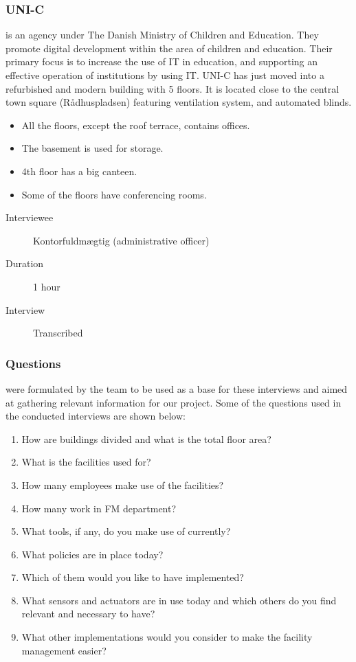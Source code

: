 \subsubsection{UNI-C} is an agency under The Danish Ministry of Children and Education. They promote digital development within the area of children and education. Their primary focus is to increase the use of IT in education, and supporting an effective operation of institutions by using IT. UNI-C has just moved into a refurbished and modern building with 5 floors. It is located close to the central town square (R\aa dhuspladsen) featuring ventilation system, and automated blinds.
\begin{itemize}
	\item All the floors, except the roof terrace, contains offices.
	\item The basement is used for storage.
	\item 4th floor has a big canteen.
	\item Some of the floors have conferencing rooms.
\end{itemize}
\begin{description}
	\item[Interviewee] Kontorfuldmægtig (administrative officer)
	\item[Duration] 1 hour
	\item[Interview] Transcribed
\end{description}

\subsubsection{Questions} were formulated by the team to be used as a base for these interviews and aimed at gathering relevant information for our project. Some of the questions used in the conducted interviews are shown below:
\begin{enumerate}
	\item How are buildings divided and what is the total floor area?
	\item What is the facilities used for? 
	\item How many employees make use of the facilities?
	\item How many work in FM department?
	\item What tools, if any, do you make use of currently?
	\item What policies are in place today?
	\item Which of them would you like to have implemented?
	\item What sensors and actuators are in use today and which others do you find relevant and necessary to have?
	\item What other implementations would you consider to make the facility management easier?
\end{enumerate}

